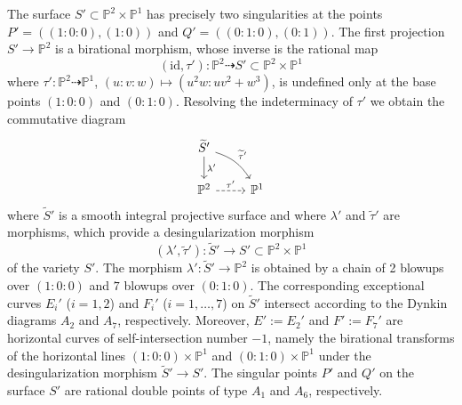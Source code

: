 \documentclass[12pt,reqno]{amsart}
\theoremstyle{definition}
\newcommand{\su}{\subset}
\newcommand{\ttto}{\dashrightarrow} %
\newcommand{\tto}{\longrightarrow}
\newcommand{\wt}{\widetilde}
\newcommand{\PP}{\mathbb{P}}
\newcommand{\lam}{\lambda}
\begin{document}
The surface $S' \su \PP^2 \times \PP^1$ has precisely two singularities at the points $P' = ((1:0:0),(1:0))$ and $Q'=((0:1:0),(0:1))$.
The first projection $S' \to \PP^2$ is a birational morphism, whose inverse is the rational map
\[ (\mathrm{id},\tau'):\PP^2 \ttto S' \subset \PP^2 \times \PP^1 \]
where $\tau':\PP^2 \ttto \PP^1$, $(u:v:w) \mapsto (u^2 w: uv^2 + w^3)$, is undefined only at the base points $(1:0:0)$ and $(0:1:0)$.
Resolving the indeterminacy of $\tau'$ we obtain the commutative diagram
\[
\begin{tikzcd}
    \wt S' \ar[d,"\lam'"] \ar[dr,"\wt \tau'", bend left=20] \\
    \PP^2 \ar[r,dashed,"\tau'"] & \PP^1
\end{tikzcd}
\]
where $\wt S'$ is a smooth integral projective surface and where $\lam'$ and $\wt \tau'$ are morphisms, which provide a desingularization morphism
\[ (\lam',\wt \tau') : \wt S' \tto S' \subset \PP^2 \times \PP^1 \]
of the variety $S'$.
The morphism $\lam':\wt S' \to \PP^2$ is obtained by a chain of 2 blowups over $(1:0:0)$ and $7$ blowups over $(0:1:0)$.
The corresponding exceptional curves $E_i'$ ($i=1,2$) and $F_i'$ ($i=1,\dots,7$) on $\wt S'$ intersect according to the Dynkin diagrams $A_2$ and $A_7$, respectively.
Moreover, $E':= E_2'$ and $F':= F_7'$ are horizontal curves of self-intersection number $-1$, namely the birational transforms of the horizontal lines $(1:0:0)\times \PP^1$ and $(0:1:0)\times \PP^1$ under the desingularization morphism $\wt S' \to S'$.
The singular points $P'$ and $Q'$ on the surface $S'$ are rational double points of type $A_1$ and $A_6$, respectively.
\end{document}
